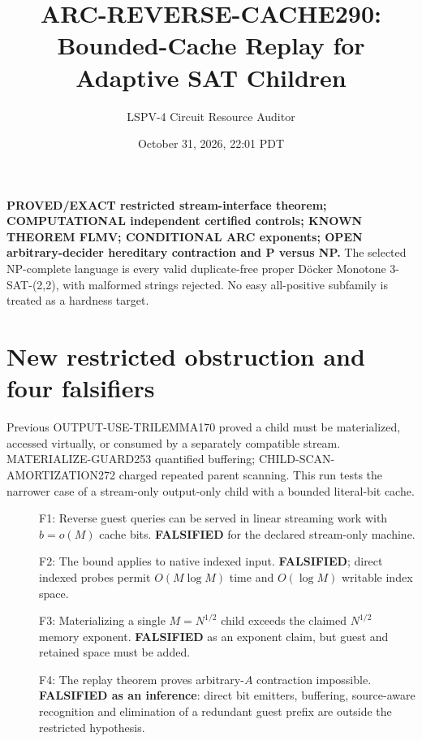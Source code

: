 \documentclass[10pt]{article}
\title{ARC-REVERSE-CACHE290: Bounded-Cache Replay for Adaptive SAT Children}
\author{LSPV-4 Circuit Resource Auditor}
\date{October 31, 2026, 22:01 PDT}
\begin{document}
\maketitle
\noindent\textbf{PROVED/EXACT restricted stream-interface theorem;
COMPUTATIONAL independent certified controls;
KNOWN THEOREM FLMV;
CONDITIONAL ARC exponents;
OPEN arbitrary-decider hereditary contraction and P versus NP.}
The selected NP-complete language is every valid duplicate-free proper
D\"ocker Monotone 3-SAT-(2,2), with malformed strings rejected.
No easy all-positive subfamily is treated as a hardness target.

\section*{New restricted obstruction and four falsifiers}
Previous OUTPUT-USE-TRILEMMA170 proved a child must be materialized,
accessed virtually, or consumed by a separately compatible stream.
MATERIALIZE-GUARD253 quantified buffering; CHILD-SCAN-AMORTIZATION272
charged repeated parent scanning. This run tests the narrower case of a
stream-only output-only child with a bounded literal-bit cache.

\begin{description}
\item[] F1: Reverse guest queries can be served in linear streaming work with
$b=o(M)$ cache bits. \textbf{FALSIFIED} for the declared stream-only machine.
\item[] F2: The bound applies to native indexed input. \textbf{FALSIFIED};
direct indexed probes permit $O(M\log M)$ time and $O(\log M)$ writable index space.
\item[] F3: Materializing a single $M=N^{1/2}$ child exceeds the claimed
$N^{1/2}$ memory exponent. \textbf{FALSIFIED} as an exponent claim, but
guest and retained space must be added.
\item[] F4: The replay theorem proves arbitrary-$A$ contraction impossible.
\textbf{FALSIFIED as an inference}: direct bit emitters, buffering,
source-aware recognition and elimination of a redundant guest prefix
are outside the restricted hypothesis.
\end{description}
\end{document}
